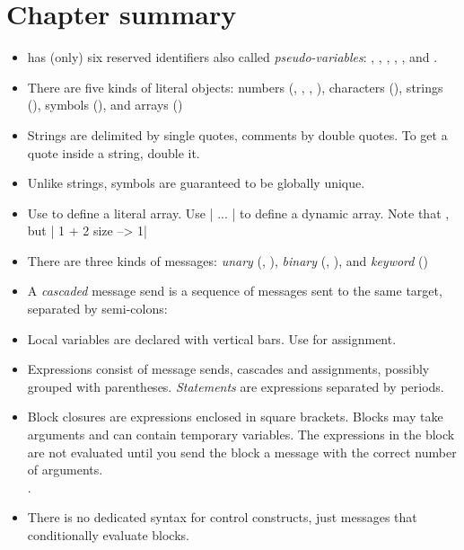 \documentclass[a4paper,10pt,twoside]{book}
\begin{document}
\section{Chapter summary}

\begin{itemize}

\item	\pharo has (only) six reserved identifiers also called \textit{pseudo-variables}: , , , , ,  and  .

\item	There are five kinds of literal objects: numbers (, , , ), characters (), strings (), symbols (), and arrays ()

\item	Strings are delimited by single quotes, comments by double quotes.
		To get a quote inside a string, double it.

\item	Unlike strings, symbols are guaranteed to be globally unique.

\item	Use  to define a literal array.
		Use \ct|{ ... }| to define a dynamic array.
		Note that 
		, but 
		\ct|{ 1 + 2 } size --> 1|

\item	There are three kinds of messages:
		\emph{unary} (\eg {}, ),
		\emph{binary} (\eg {}, ), and
		\emph{keyword} (\eg {})

\item	A \emph{cascaded} message send is a sequence of messages sent to the same target, separated by semi-colons:

\item	Local variables are declared with vertical bars.
		Use \ct{:=} for assignment.

\item	Expressions consist of message sends, cascades and assignments, possibly grouped with parentheses.
		\emph{Statements} are expressions separated by periods.

\item	Block closures are expressions enclosed in square brackets.
		Blocks may take arguments and can contain temporary variables.
		The expressions in the block are not evaluated until you send the block a 
		 message with the correct number of arguments.\\
		.

\item	There is no dedicated syntax for control constructs, just messages that conditionally evaluate blocks.\\

\end{itemize}

\ifx\wholebook\relax\else
\end{document}

